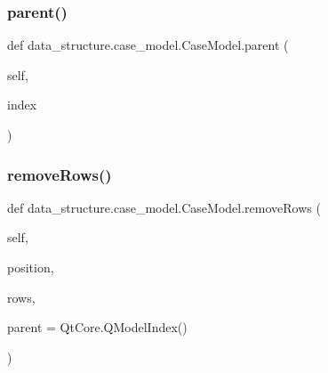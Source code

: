 \hypertarget{classdata__structure_1_1case__model_1_1_case_model_afa98c784f58d15bdb49c9ba85854ae03}{}\label{classdata__structure_1_1case__model_1_1_case_model_afa98c784f58d15bdb49c9ba85854ae03} 
\subsubsection{\texorpdfstring{parent()}{parent()}}
{\footnotesize\ttfamily def data\+\_\+structure.\+case\+\_\+model.\+Case\+Model.\+parent (\begin{DoxyParamCaption}\item[{}]{self,  }\item[{}]{index }\end{DoxyParamCaption})}

\hypertarget{classdata__structure_1_1case__model_1_1_case_model_aa80631169f93be117b17729ae8fa7bf6}{}\label{classdata__structure_1_1case__model_1_1_case_model_aa80631169f93be117b17729ae8fa7bf6} 
\subsubsection{\texorpdfstring{remove\+Rows()}{removeRows()}}
{\footnotesize\ttfamily def data\+\_\+structure.\+case\+\_\+model.\+Case\+Model.\+remove\+Rows (\begin{DoxyParamCaption}\item[{}]{self,  }\item[{}]{position,  }\item[{}]{rows,  }\item[{}]{parent = {\ttfamily QtCore.QModelIndex()} }\end{DoxyParamCaption})}

\hypertarget{classdata__structure_1_1case__model_1_1_case_model_a44b390eef57be2a4883c1e6599b5a8ca}{}\label{classdata__structure_1_1case__model_1_1_case_model_a44b390eef57be2a4883c1e6599b5a8ca} 
